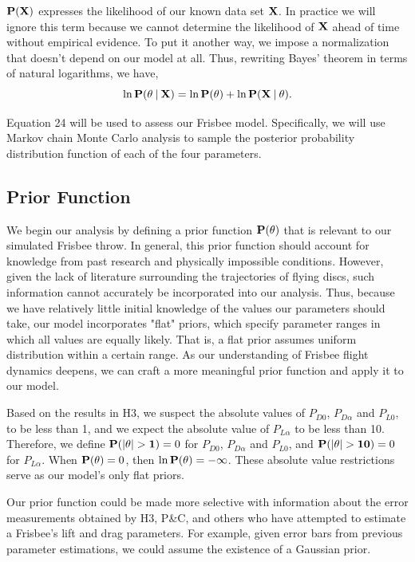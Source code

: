 \documentclass[a4paper,12pt, oneside]{article}
\newcommand\givenbase[1][]{\:#1\lvert\:}
\let\given\givenbase
\begin{document}
$\bold{P(\bold{X})}$ expresses the likelihood of our known data set $\bold{X}$. In practice we will ignore this term because we cannot determine the likelihood of $\bold{X}$ ahead of time without empirical evidence. To put it another way, we impose a normalization that doesn't depend on our model at all. Thus, rewriting Bayes' theorem in terms of natural logarithms, we have,
\begin{equation}
\ln\bold{P}(\theta\given\bold{X})=\ln{\bold{P(\theta})+\ln\bold{P({X}\given\theta})}.
\end{equation}

Equation 24 will be used to assess our Frisbee model.  Specifically, we will use Markov chain Monte Carlo analysis to sample the posterior probability distribution function of each of the four parameters. 


\subsection{Prior Function}
We begin our analysis by defining a prior function $\bold{P(\theta)}$ that is relevant to our simulated Frisbee throw. In general, this prior function should account for knowledge from past research and physically impossible conditions. However, given the lack of literature surrounding the trajectories of flying discs, such information cannot accurately be incorporated into our analysis.  Thus, because we have relatively little initial knowledge of the values our parameters should take, our model incorporates "flat" priors, which specify parameter ranges in which all values are equally likely. That is, a flat prior assumes uniform distribution within a certain range. As our understanding of Frisbee flight dynamics deepens, we can craft a more meaningful prior function and apply it to our model. 

Based on the results in H3, we suspect the absolute values of $P_{D0}$, $P_{D\alpha}$ and $P_{L0}$, to be less than 1, and we expect the absolute value of $P_{L\alpha}$ to be less than 10. Therefore, we define $\bold{P(\left|\theta\right|>1)}=0$ for $P_{D0}$, $P_{D\alpha}$ and $P_{L0}$, and $\bold{P(\left|\theta\right|>10)}=0$ for $P_{L\alpha}$. When  $\bold{P(\theta)}=0$, then $\ln\bold{P(\theta)}=-\infty$. These absolute value restrictions serve as our model's only flat priors.

Our prior function could be made more selective with information about the error measurements obtained by H3, P\&C, and others who have attempted to estimate a Frisbee's lift and drag parameters. For example, given error bars from previous parameter estimations, we could assume the existence of a Gaussian prior. 
\end{document}
